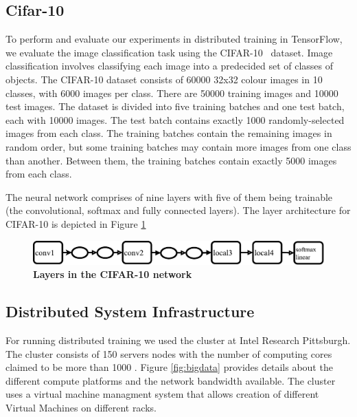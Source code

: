 \subsection{Cifar-10}
To perform and evaluate our experiments in distributed training in TensorFlow, we evaluate the image classification task using the CIFAR-10~\cite{cifar10} dataset. Image classification involves classifying each image into a predecided set of classes of objects. The CIFAR-10 dataset consists of 60000 32x32 colour images in 10 classes, with 6000 images per class. There are 50000 training images and 10000 test images. The dataset is divided into five training batches and one test batch, each with 10000 images. The test batch contains exactly 1000 randomly-selected images from each class. The training batches contain the remaining images in random order, but some training batches may contain more images from one class than another. Between them, the training batches contain exactly 5000 images from each class. 

The neural network comprises of nine layers with five of them being trainable (the convolutional, softmax and fully connected layers). The layer architecture for CIFAR-10 is depicted in Figure \ref{fig:cifar10}

\begin{figure}[h]
\centering
  \includegraphics[keepaspectratio,width=\columnwidth]{figures/Cifar10_tensorflow.pdf}
  \caption{\textbf{Layers in the CIFAR-10 network}}
  \label{fig:cifar10}
\end{figure}

\subsection{Distributed System Infrastructure}

For running distributed training we used the cluster
at Intel Research Pittsburgh. The cluster consists 
of 150 servers nodes with the number of computing
cores claimed to be more than 1000 \cite{tashi}.
Figure \ref{fig:bigdata} provides details about the
different compute platforms and the network
bandwidth available. The cluster uses a virtual machine
managment system \cite{tashi} that allows creation of different Virtual
Machines on different racks.

